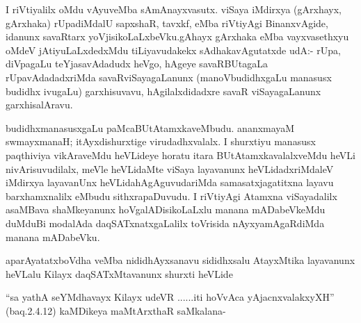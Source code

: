 \begin{artha}
I riVtiyalilx oMdu vAyuveMba sAmAnayxvasutx. viSaya iMdirxya
\-(gArxhayx, gArxhaka)  rUpadiMdalU sapxshaR, tavxkf,
eMba riVtiyAgi BinanxvAgide, idanunx \-savaRtarx
yoVjisikoLaLxbeVku.gAhayx gArxhaka eMba vayxvasethxyu oMdeV
jAtiyuLaLxdedxMdu tiLiyavudakekx sAdhakavAgutatxde udA:- rUpa, diVpagaLu
teYjasavAdadudx heVgo, hAgeye savaRBUtagaLa rUpavAdadadxriMda
savaRviSayagaLanunx (manoVbudidhx\-gaLu manasusx budidhx ivugaLu)
garxhisuvavu, hAgilalxdidadxre savaR viSayagaLanunx garxhisa\-lAravu.

budidhxmanasusxgaLu paMcaBUtAtamxkaveMbudu. ananxmayaM swmayxmanaH;
\break itAyxdishurxtige virudadhxvalalx. I shurxtiyu manasusx paqthiviya
vikAraveMdu \-heVLideye horatu itara BUtAtamxkavalalxveMdu heVLi
nivArisuvudilalx, meVle heVLidaMte viSaya layavanunx heVLidadxriMdaleV
iMdirxya layavanUnx heVLidahAgAguvuda\-riMda samasatxjagatitxna layavu
barxhamxnalilx eMbudu sithxrapaDuvudu. I riVtiyAgi Atamxna
viSayadalilx asaMBava shaMkeyanunx hoVgalADisikoLaLxlu manana
mADa\-beVkeMdu duMduBi modalAda daqSATxnatxgaLalilx toVrisida
nAyxyamAgaRdiMda \-manana mADabeVku.
\end{artha}

\begin{artha}
aparAyatatxboVdha veMba nididhAyxsanavu sididhxsalu AtayxMtika
layavanunx heVLalu Kilayx daqSATxMtavanunx shurxti heVLide
\end{artha}

\begin{artha}
``sa yathA seYMdhavayx Kilayx udeVR ......iti hoVvAca yAjacnxvalakxyXH'' (baq.2.4.12) kaMDikeya maMtArxthaR saMkalana-
\end{artha}

